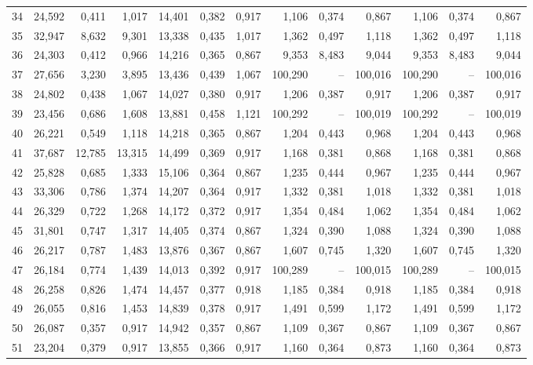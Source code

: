 \begin{longtable}{lrrrrrrrrrrrr}
34 & 24,592 & 0,411 & 1,017 & 14,401 & 0,382 & 0,917 & 1,106 & 0,374 & 0,867 & 1,106 & 0,374 & 0,867 \\
35 & 32,947 & 8,632 & 9,301 & 13,338 & 0,435 & 1,017 & 1,362 & 0,497 & 1,118 & 1,362 & 0,497 & 1,118 \\
36 & 24,303 & 0,412 & 0,966 & 14,216 & 0,365 & 0,867 & 9,353 & 8,483 & 9,044 & 9,353 & 8,483 & 9,044 \\
37 & 27,656 & 3,230 & 3,895 & 13,436 & 0,439 & 1,067 & 100,290 & -- & 100,016 & 100,290 & -- & 100,016 \\
38 & 24,802 & 0,438 & 1,067 & 14,027 & 0,380 & 0,917 & 1,206 & 0,387 & 0,917 & 1,206 & 0,387 & 0,917 \\
39 & 23,456 & 0,686 & 1,608 & 13,881 & 0,458 & 1,121 & 100,292 & -- & 100,019 & 100,292 & -- & 100,019 \\
40 & 26,221 & 0,549 & 1,118 & 14,218 & 0,365 & 0,867 & 1,204 & 0,443 & 0,968 & 1,204 & 0,443 & 0,968 \\
41 & 37,687 & 12,785 & 13,315 & 14,499 & 0,369 & 0,917 & 1,168 & 0,381 & 0,868 & 1,168 & 0,381 & 0,868 \\
42 & 25,828 & 0,685 & 1,333 & 15,106 & 0,364 & 0,867 & 1,235 & 0,444 & 0,967 & 1,235 & 0,444 & 0,967 \\
43 & 33,306 & 0,786 & 1,374 & 14,207 & 0,364 & 0,917 & 1,332 & 0,381 & 1,018 & 1,332 & 0,381 & 1,018 \\
44 & 26,329 & 0,722 & 1,268 & 14,172 & 0,372 & 0,917 & 1,354 & 0,484 & 1,062 & 1,354 & 0,484 & 1,062 \\
45 & 31,801 & 0,747 & 1,317 & 14,405 & 0,374 & 0,867 & 1,324 & 0,390 & 1,088 & 1,324 & 0,390 & 1,088 \\
46 & 26,217 & 0,787 & 1,483 & 13,876 & 0,367 & 0,867 & 1,607 & 0,745 & 1,320 & 1,607 & 0,745 & 1,320 \\
47 & 26,184 & 0,774 & 1,439 & 14,013 & 0,392 & 0,917 & 100,289 & -- & 100,015 & 100,289 & -- & 100,015 \\
48 & 26,258 & 0,826 & 1,474 & 14,457 & 0,377 & 0,918 & 1,185 & 0,384 & 0,918 & 1,185 & 0,384 & 0,918 \\
49 & 26,055 & 0,816 & 1,453 & 14,839 & 0,378 & 0,917 & 1,491 & 0,599 & 1,172 & 1,491 & 0,599 & 1,172 \\
50 & 26,087 & 0,357 & 0,917 & 14,942 & 0,357 & 0,867 & 1,109 & 0,367 & 0,867 & 1,109 & 0,367 & 0,867 \\
51 & 23,204 & 0,379 & 0,917 & 13,855 & 0,366 & 0,917 & 1,160 & 0,364 & 0,873 & 1,160 & 0,364 & 0,873 \\

\end{longtable}
